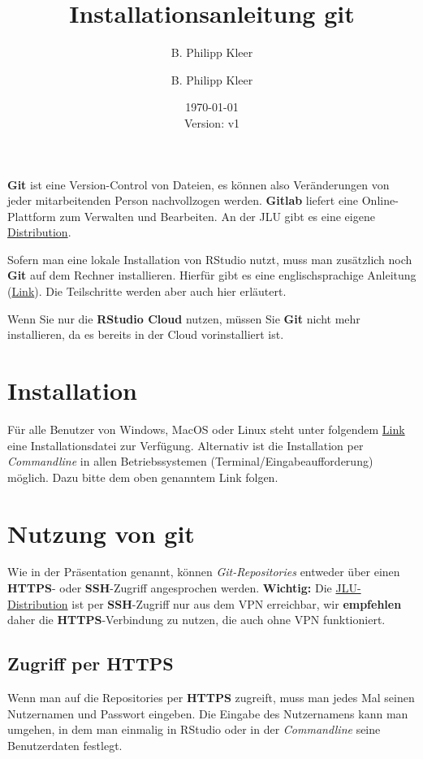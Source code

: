 \documentclass[11pt,a4paper]{article}
\author{B. Philipp Kleer}
\title{%
  Installationsanleitung git \\
  }
\author{B. Philipp Kleer}
\date{\today \\ \small{Version: v1}}
\begin{document}
\maketitle

\textbf{Git} ist eine Version-Control von Dateien, es können also Veränderungen von jeder mitarbeitenden Person nachvollzogen werden. \textbf{Gitlab} liefert eine Online-Plattform zum Verwalten und Bearbeiten. An der JLU gibt es eine eigene \href{https://gitlab.ub.uni-giessen.de}{Distribution}.

Sofern man eine lokale Installation von RStudio nutzt, muss man zusätzlich noch \textbf{Git} auf dem Rechner installieren. Hierfür gibt es eine englischsprachige Anleitung (\href{https://happygitwithr.com/install-git.html}{Link}). Die Teilschritte werden aber auch hier erläutert. 

Wenn Sie nur die \textbf{RStudio Cloud} nutzen, müssen Sie \textbf{Git} nicht mehr installieren, da es bereits in der Cloud vorinstalliert ist.

\section*{Installation}
Für alle Benutzer von Windows, MacOS oder Linux steht unter folgendem \href{http://git-scm.com/downloads}{Link} eine Installationsdatei zur Verfügung. Alternativ ist die Installation per \textit{Commandline} in allen Betriebssystemen (Terminal/Eingabeaufforderung) möglich. Dazu bitte dem oben genanntem Link folgen. 

\section*{Nutzung von git}
Wie in der Präsentation genannt, können \textit{Git-Repositories} entweder über einen \textbf{HTTPS}- oder \textbf{SSH}-Zugriff angesprochen werden. \textbf{Wichtig:} Die \href{https://gitlab.ub.uni-giessen.de}{JLU-Distribution} ist per \textbf{SSH}-Zugriff nur aus dem VPN erreichbar, wir \textbf{empfehlen} daher die \textbf{HTTPS}-Verbindung zu nutzen, die auch ohne VPN funktioniert. 

\subsection*{Zugriff per HTTPS}
Wenn man auf die Repositories per \textbf{HTTPS} zugreift, muss man jedes Mal seinen Nutzernamen und Passwort eingeben. Die Eingabe des Nutzernamens kann man umgehen, in dem man einmalig in RStudio oder in der \textit{Commandline} seine Benutzerdaten festlegt. 
\end{document}
